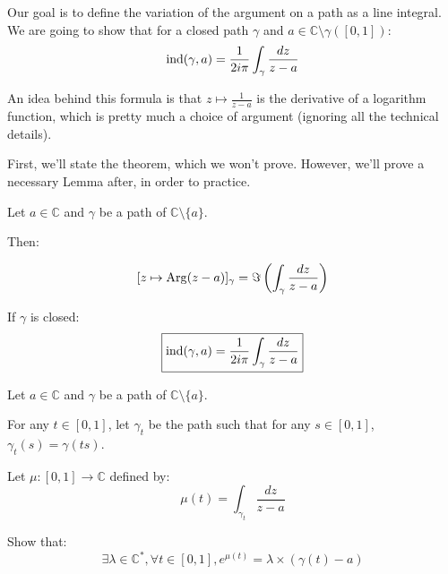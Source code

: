 Our goal is to define the variation of the argument on a path as a line integral. We are going to show that for a closed path $\gamma$ and $a\in\mathbb{C}\setminus\gamma([0,1])$:
$$\operatorname{ind}(\gamma, a) = \frac{1}{2i\pi}\int_\gamma\frac{dz}{z - a}$$

An idea behind this formula is that $z \mapsto \frac{1}{z - a}$ is the derivative of a logarithm function, which is pretty much a choice of argument (ignoring all the technical details).

First, we'll state the theorem, which we won't prove. However, we'll prove a necessary Lemma after, in order to practice.


\begin{thm*}
    Let $a\in\mathbb{C}$ and $\gamma$ be a path of $\mathbb{C} \setminus \lbrace a \rbrace$.

    Then:

    $$ [z \mapsto \operatorname{Arg}(z - a)]_\gamma = \Im\left(\int_\gamma \frac{dz}{z-a}\right)$$

    If $\gamma$ is closed:
    $$\boxed{\operatorname{ind}(\gamma, a) = \frac{1}{2i\pi}\int_\gamma\frac{dz}{z-a}}$$
\end{thm*}

\begin{exo}
    Let $a\in\mathbb{C}$ and $\gamma$ be a path of $\mathbb{C} \setminus \lbrace a \rbrace$.

    For any $t\in[0,1]$, let $\gamma_t$ be the path such that for any $s\in[0,1]$, $\gamma_t(s) = \gamma(ts)$. 

    Let $\mu : [0,1] \rightarrow \mathbb{C}$ defined by:
    $$ \mu(t) = \int_{\gamma_t} \frac{dz}{z-a}$$ 

    Show that:
    $$\exists \lambda\in\mathbb{C}^*, \forall t \in [0,1], e^{\mu(t)} = \lambda \times (\gamma(t) -a) $$
\end{exo}

